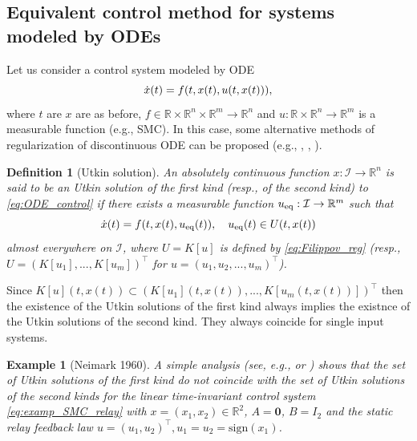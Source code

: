 \documentclass{article}
\newcommand{\R}{\mathbb{R}}
\newcommand{\zero}{\mathbf{0}}
\newcommand{\sign}{\mathrm{sign}}
\newtheorem{definition}{Definition}
\newtheorem{example}{Example}
\begin{document}
\subsection{Equivalent control method for systems modeled by ODEs}
Let us consider a control system modeled by ODE\vspace{-1mm}
\begin{equation}\label{eq:ODE_control}
	\dot x(t)=f(t,x(t),u(t,x(t))), \vspace{-1mm}
\end{equation}
where $t$ are $x$ are as before, $f\in \R\times \R^n\times \R^m\to \R^n$ and $u: \R\times \R^n\to\R^m$
is a measurable  function (e.g., SMC). In this case, some alternative methods
of regularization of discontinuous ODE 
can be proposed (e.g.,  \cite{Utkin1992:Book},  \cite{Filippov1988:Book}, \cite{PolyakovFridman2014:JFI}). %
\begin{definition}[\small Utkin solution]\label{def:Utkin}
	\itshape An absolutely continuous function $x : \mathcal{I}\to\R^n$  is said to be
	an Utkin solution of the first kind (resp., of the second kind) to \eqref{eq:ODE_control} if
	there exists a measurable function $u_{\rm eq}:\mathcal{I}\to \R^m$ such that \vspace{-1mm}
	\begin{equation}
		\dot x(t)= f(t,x(t), u_{\rm eq}(t)), \quad u_{\rm eq}(t)\in U(t,x(t))\vspace{-1mm}
	\end{equation}
	almost everywhere on $\mathcal{I}$, where $U=K[u]$ is defined by \eqref{eq:Filippov_reg} (resp., $U=(K[u_1], ..., K[u_m])^{\top}$ for $u=(u_1, u_2,...,u_m)^{\top}$).
\end{definition}

Since  $K[u](t,x(t))\subset (K[u_1](t,x(t)),...,K[u_m(t,x(t))])^{\top}$ then 
the existence of the Utkin solutions of the first  kind always implies the existnce of the Utkin solutions of the second kind. They always coincide for single input systems.
\begin{example}[Neimark 1960]\itshape A simple analysis  (see, e.g., \cite{Neimark1961:IFAC_Congress} or \cite[Example 2]{PolyakovFridman2014:JFI}) shows that the set of Utkin solutions of the first kind do not coincide with the set of Utkin solutions of the second kinds for the linear time-invariant control system \eqref{eq:examp_SMC_relay} 
	with	$x=(x_1,x_2)\in \R^2$, $A=\zero$, $B=I_2$ and 
	the static relay feedback law $u=(u_1,u_2)^{\top}, u_1=u_2=\sign(x_1)$.
\end{example}
\end{document}
